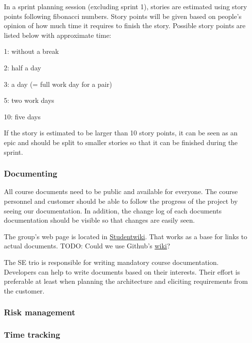 In a sprint planning session (excluding sprint 1), stories are estimated using 
story points following fibonacci numbers. Story points will be given based on 
people’s opinion of how much time it requires to finish the story. Possible 
story points are listed below with approximate time:
\begin{description*}
\item[1:] without a break
\item[2:] half a day
\item[3:] a day (= full work day for a pair)
\item[5:] two work days
\item[10:] five days
\end{description*}
	
If the story is estimated to be larger than 10 story points, it can be seen as 
an epic and should be split to smaller stories so that it can be finished 
during the sprint.

\subsubsection{Documenting}

All course documents need to be public and available for everyone. The course 
personnel and customer should be able to follow the progress of the project by 
seeing our documentation. In addition, the change log of each documents 
documentation should be visible so that changes are easily seen.

The group's web page is located in 
\href{https://studentwiki.aalto.fi/display/MOB/Mobilefant+Home}{Studentwiki}. That works as a base for links to actual documents.
TODO: Could we use Github's \href{https://github.com/phyper/mobilefant-documentation/wiki}{wiki}?

The SE trio is responsible for writing mandatory course documentation. 
Developers can help to write documents based on their interests. Their effort 
is preferable at least when planning the architecture and eliciting 
requirements from the customer. 

\subsubsection{Risk management}

\subsubsection{Time tracking}

